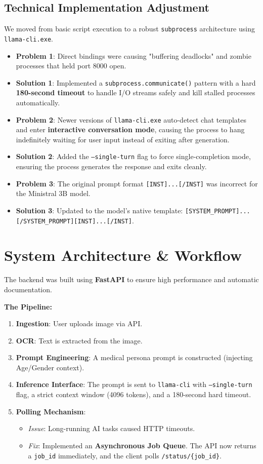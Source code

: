 \documentclass{article}
\begin{document}
\subsection{Technical Implementation Adjustment}
We moved from basic script execution to a robust \texttt{subprocess} architecture using \texttt{llama-cli.exe}.
\begin{itemize}
    \item \textbf{Problem 1}: Direct bindings were causing "buffering deadlocks" and zombie processes that held port 8000 open.
    \item \textbf{Solution 1}: Implemented a \texttt{subprocess.communicate()} pattern with a hard \textbf{180-second timeout} to handle I/O streams safely and kill stalled processes automatically.
    \item \textbf{Problem 2}: Newer versions of \texttt{llama-cli.exe} auto-detect chat templates and enter \textbf{interactive conversation mode}, causing the process to hang indefinitely waiting for user input instead of exiting after generation.
    \item \textbf{Solution 2}: Added the \texttt{--single-turn} flag to force single-completion mode, ensuring the process generates the response and exits cleanly.
    \item \textbf{Problem 3}: The original prompt format \texttt{[INST]...[/INST]} was incorrect for the Ministral 3B model.
    \item \textbf{Solution 3}: Updated to the model's native template: \texttt{[SYSTEM\_PROMPT]...[/SYSTEM\_PROMPT][INST]...[/INST]}.
\end{itemize}

\section{System Architecture \& Workflow}
The backend was built using \textbf{FastAPI} to ensure high performance and automatic documentation.

\textbf{The Pipeline:}
\begin{enumerate}
    \item \textbf{Ingestion}: User uploads image via API.
    \item \textbf{OCR}: Text is extracted from the image.
    \item \textbf{Prompt Engineering}: A medical persona prompt is constructed (injecting Age/Gender context).
    \item \textbf{Inference Interface}: The prompt is sent to \texttt{llama-cli} with \texttt{--single-turn} flag, a strict context window (4096 tokens), and a 180-second hard timeout.
    \item \textbf{Polling Mechanism}:
    \begin{itemize}
        \item \textit{Issue}: Long-running AI tasks caused HTTP timeouts.
        \item \textit{Fix}: Implemented an \textbf{Asynchronous Job Queue}. The API now returns a \texttt{job\_id} immediately, and the client polls \texttt{/status/\{job\_id\}}.
    \end{itemize}
\end{enumerate}
\end{document}
